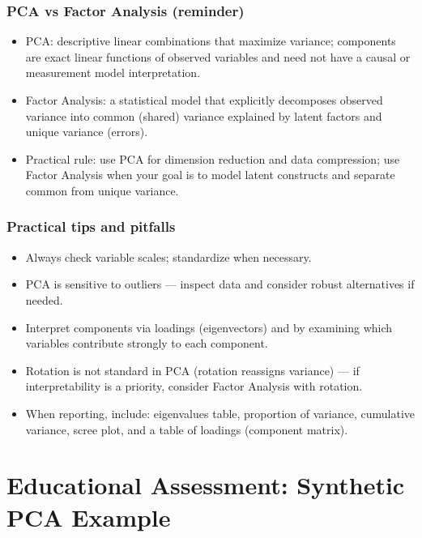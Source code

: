 \documentclass[aspectratio=169]{beamer}
\begin{document}
\begin{frame}
    \frametitle{PCA vs Factor Analysis (reminder)}
    \begin{itemize}
        \item PCA: descriptive linear combinations that maximize variance; components are exact linear functions of observed variables and need not have a causal or measurement model interpretation. \pause
        \item Factor Analysis: a statistical model that explicitly decomposes observed variance into common (shared) variance explained by latent factors and unique variance (errors). \pause
        \item Practical rule: use PCA for dimension reduction and data compression; use Factor Analysis when your goal is to model latent constructs and separate common from unique variance. \pause
    \end{itemize}
\end{frame}

\begin{frame}
    \frametitle{Practical tips and pitfalls}
    \begin{itemize}
        \item Always check variable scales; standardize when necessary. \pause
        \item PCA is sensitive to outliers — inspect data and consider robust alternatives if needed. \pause
        \item Interpret components via loadings (eigenvectors) and by examining which variables contribute strongly to each component. \pause
        \item Rotation is not standard in PCA (rotation reassigns variance) — if interpretability is a priority, consider Factor Analysis with rotation. \pause
        \item When reporting, include: eigenvalues table, proportion of variance, cumulative variance, scree plot, and a table of loadings (component matrix). \pause
    \end{itemize}
\end{frame}

\section{Educational Assessment: Synthetic PCA Example}
\end{document}
